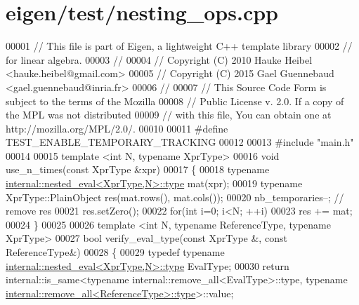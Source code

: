 \hypertarget{eigen_2test_2nesting__ops_8cpp_source}{}\section{eigen/test/nesting\+\_\+ops.cpp}
\label{eigen_2test_2nesting__ops_8cpp_source}

\begin{DoxyCode}
00001 \textcolor{comment}{// This file is part of Eigen, a lightweight C++ template library}
00002 \textcolor{comment}{// for linear algebra.}
00003 \textcolor{comment}{//}
00004 \textcolor{comment}{// Copyright (C) 2010 Hauke Heibel <hauke.heibel@gmail.com>}
00005 \textcolor{comment}{// Copyright (C) 2015 Gael Guennebaud <gael.guennebaud@inria.fr>}
00006 \textcolor{comment}{//}
00007 \textcolor{comment}{// This Source Code Form is subject to the terms of the Mozilla}
00008 \textcolor{comment}{// Public License v. 2.0. If a copy of the MPL was not distributed}
00009 \textcolor{comment}{// with this file, You can obtain one at http://mozilla.org/MPL/2.0/.}
00010 
00011 \textcolor{preprocessor}{#define TEST\_ENABLE\_TEMPORARY\_TRACKING}
00012 
00013 \textcolor{preprocessor}{#include "main.h"}
00014 
00015 \textcolor{keyword}{template} <\textcolor{keywordtype}{int} N, \textcolor{keyword}{typename} XprType>
00016 \textcolor{keywordtype}{void} use\_n\_times(\textcolor{keyword}{const} XprType &xpr)
00017 \{
00018   \textcolor{keyword}{typename} \hyperlink{class_eigen_1_1internal_1_1_tensor_lazy_evaluator_writable}{internal::nested\_eval<XprType,N>::type} mat(xpr);
00019   \textcolor{keyword}{typename} XprType::PlainObject res(mat.rows(), mat.cols());
00020   nb\_temporaries--; \textcolor{comment}{// remove res}
00021   res.setZero();
00022   \textcolor{keywordflow}{for}(\textcolor{keywordtype}{int} i=0; i<N; ++i)
00023     res += mat;
00024 \}
00025 
00026 \textcolor{keyword}{template} <\textcolor{keywordtype}{int} N, \textcolor{keyword}{typename} ReferenceType, \textcolor{keyword}{typename} XprType>
00027 \textcolor{keywordtype}{bool} verify\_eval\_type(\textcolor{keyword}{const} XprType &, \textcolor{keyword}{const} ReferenceType&)
00028 \{
00029   \textcolor{keyword}{typedef} \textcolor{keyword}{typename} \hyperlink{class_eigen_1_1internal_1_1_tensor_lazy_evaluator_writable}{internal::nested\_eval<XprType,N>::type} EvalType;
00030   \textcolor{keywordflow}{return} internal::is\_same<typename internal::remove\_all<EvalType>::type, \textcolor{keyword}{typename} 
      \hyperlink{group___sparse_core___module}{internal::remove\_all<ReferenceType>::type}>::value;

\end{DoxyCode}
